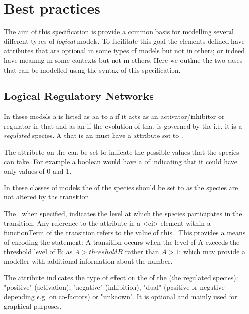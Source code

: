 
\section{Best practices}
\label{best-practices}

The aim of this specification is provide a common basis for modelling several different types of \textit{logical} models. To facilitate this goal the elements defined have attributes that are optional in some types of models but not in others; or indeed have meaning in some contexts but not in others.  Here we outline the two cases that can be modelled using the syntax of this specification.

\subsection{Logical Regulatory Networks}

In these models a \QualitativeSpecies is listed as an \Input to a \Transition if it acts as an activator/inhibitor or regulator in that \Transition and as an \Output if the evolution of that \QualitativeSpecies is governed by the \Transition i.e. it is a \textit{regulated} species. A \QualitativeSpecies that is an \Output must have a  attribute set to .

The  attribute on the \QualitativeSpecies can be set to indicate the possible values that the species can take. For example a boolean would have a  of  indicating that it could have only values of 0 and 1. 


In these classes of models the  of the \Input species should be set to  as the \Input species are not altered by the transition.




The , when specified, indicates the level at which the species participates in the transition. Any reference to the \Input {} attribute in a <ci> element within a functionTerm of the transition refers to the value of this . This provides a means of encoding the statement: A transition occurs when the level of A exceeds the threshold level of B; as $A > thresholdB$ rather than $A > 1$; which may provide a modeller with additional information about the number.


The  attribute indicates the type of effect on the \Output of the \Transition (the regulated species): "positive" (activation), "negative" (inhibition), "dual" (positive or negative depending e.g. on co-factors) or "unknown". It is optional and mainly used for graphical purposes.

